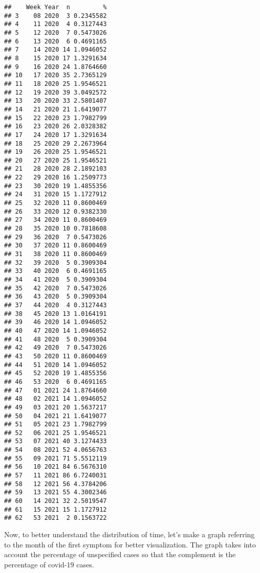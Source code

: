 \documentclass[
]{article}
\begin{document}
\begin{verbatim}
##    Week Year  n         %
## 3    08 2020  3 0.2345582
## 4    11 2020  4 0.3127443
## 5    12 2020  7 0.5473026
## 6    13 2020  6 0.4691165
## 7    14 2020 14 1.0946052
## 8    15 2020 17 1.3291634
## 9    16 2020 24 1.8764660
## 10   17 2020 35 2.7365129
## 11   18 2020 25 1.9546521
## 12   19 2020 39 3.0492572
## 13   20 2020 33 2.5801407
## 14   21 2020 21 1.6419077
## 15   22 2020 23 1.7982799
## 16   23 2020 26 2.0328382
## 17   24 2020 17 1.3291634
## 18   25 2020 29 2.2673964
## 19   26 2020 25 1.9546521
## 20   27 2020 25 1.9546521
## 21   28 2020 28 2.1892103
## 22   29 2020 16 1.2509773
## 23   30 2020 19 1.4855356
## 24   31 2020 15 1.1727912
## 25   32 2020 11 0.8600469
## 26   33 2020 12 0.9382330
## 27   34 2020 11 0.8600469
## 28   35 2020 10 0.7818608
## 29   36 2020  7 0.5473026
## 30   37 2020 11 0.8600469
## 31   38 2020 11 0.8600469
## 32   39 2020  5 0.3909304
## 33   40 2020  6 0.4691165
## 34   41 2020  5 0.3909304
## 35   42 2020  7 0.5473026
## 36   43 2020  5 0.3909304
## 37   44 2020  4 0.3127443
## 38   45 2020 13 1.0164191
## 39   46 2020 14 1.0946052
## 40   47 2020 14 1.0946052
## 41   48 2020  5 0.3909304
## 42   49 2020  7 0.5473026
## 43   50 2020 11 0.8600469
## 44   51 2020 14 1.0946052
## 45   52 2020 19 1.4855356
## 46   53 2020  6 0.4691165
## 47   01 2021 24 1.8764660
## 48   02 2021 14 1.0946052
## 49   03 2021 20 1.5637217
## 50   04 2021 21 1.6419077
## 51   05 2021 23 1.7982799
## 52   06 2021 25 1.9546521
## 53   07 2021 40 3.1274433
## 54   08 2021 52 4.0656763
## 55   09 2021 71 5.5512119
## 56   10 2021 84 6.5676310
## 57   11 2021 86 6.7240031
## 58   12 2021 56 4.3784206
## 59   13 2021 55 4.3002346
## 60   14 2021 32 2.5019547
## 61   15 2021 15 1.1727912
## 62   53 2021  2 0.1563722
\end{verbatim}

Now, to better understand the distribution of time, let's make a graph
referring to the month of the first symptom for better visualization.
The graph takes into account the percentage of unspecified cases so that
the complement is the percentage of covid-19 cases.
\end{document}
